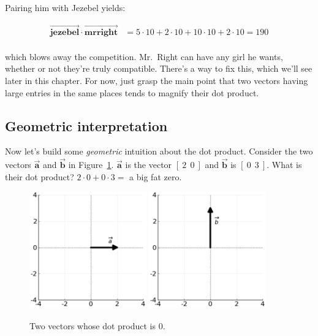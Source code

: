 Pairing him with Jezebel yields:

\begin{align*}
\overrightarrow{\textbf{jezebel}} \cdot \overrightarrow{\textbf{mrright}} &=
5 \cdot 10 + 2 \cdot 10 + 10 \cdot 10 + 2 \cdot 10 = 190 \\
\end{align*}

which blows away the competition. Mr.~Right can have any girl he wants, whether
or not they're truly compatible. There's a way to fix this, which we'll see
later in this chapter. For now, just grasp the main point that two vectors
having large entries in the same places tends to magnify their dot product.

\subsection{Geometric interpretation}

Now let's build some \textit{geometric} intuition about the dot product.
Consider the two vectors $\overrightarrow{\textbf{a}}$ and
$\overrightarrow{\textbf{b}}$ in Figure~\ref{fig:dotproduct1}.
$\overrightarrow{\textbf{a}}$ is the vector $[\ 2\ \ 0\ ]$ and
$\overrightarrow{\textbf{b}}$ is $[\ 0\ \ 3\ ]$. What is their dot product?
$2\cdot 0 + 0\cdot 3 = $ a big fat zero.

\begin{figure}[ht]
\centering
\includegraphics[width=0.45\textwidth]{dotProduct1a.png}
\includegraphics[width=0.45\textwidth]{dotProduct1b.png}
\caption{Two vectors whose dot product is 0.}
\label{fig:dotproduct1}
\end{figure}

